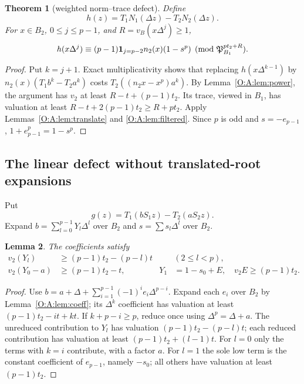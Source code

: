 \documentclass[11pt]{amsart}
\newtheorem{theorem}{Theorem}[section]
\newtheorem{lemma}[theorem]{Lemma}
\theoremstyle{definition}
\theoremstyle{remark}
\begin{document}
\begin{theorem}[weighted norm--trace defect]\label{O:A:thm:h}
Define
\[
 h(z)=T_1N_1(\Delta z)-T_2N_2(\Delta z).
\]
For $x\in B_2$, $0\le j\le p-1$, and $R=v_B(x\Delta^j)\ge1$,
\begin{equation}
 h(x\Delta^j)\equiv(p-1)\mathbf1_{j=p-2}n_2(x)(1-s^p)
       \pmod{\mathfrak P_{B_1}^{pt_2+R}}.\label{O:A:eq:h}
\end{equation}
\end{theorem}
\begin{proof}
Put $k=j+1$.
Exact multiplicativity shows that replacing $h(x\Delta^{k-1})$ by
$n_2(x)(T_1b^k-T_2a^k)$ costs
$T_2((n_2x-x^p)a^k)$.
By Lemma~\ref{O:A:lem:power}, the argument has $v_2$ at least
$R-t+(p-1)t_2$.  Its trace, viewed in $B_1$, has valuation at least
$R-t+2(p-1)t_2\ge R+pt_2$.
Apply Lemmas~\ref{O:A:lem:translate} and \ref{O:A:lem:filtered}.
Since $p$ is odd and $s=-e_{p-1}$, $1+e_{p-1}^p=1-s^p$.
\end{proof}

\subsection{The linear defect without translated-root expansions}
Put
\[
 g(z)=T_1(bS_1z)-T_2(aS_2z).
\]
Expand $b=\sum_{l=0}^{p-1}Y_l\Delta^l$ over $B_2$ and
$s=\sum s_l\Delta^l$ over $B_2$.
\begin{lemma}\label{O:A:lem:bcoeff}
The coefficients satisfy
\begin{align*}
 v_2(Y_l)&\ge(p-1)t_2-(p-l)t&& (2\le l<p),\\
 v_2(Y_0-a)&\ge(p-1)t_2-t,&
 Y_1&=1-s_0+E,\quad v_2E\ge(p-1)t_2.
\end{align*}
\end{lemma}
\begin{proof}
Use $b=a+\Delta+\sum_{i=1}^{p-1}(-1)^ie_i\Delta^{p-i}$.
Expand each $e_i$ over $B_2$ by Lemma~\ref{O:A:lem:coeff}; its $\Delta^k$
coefficient has valuation at least $(p-1)t_2-it+kt$.
If $k+p-i\ge p$, reduce once using $\Delta^p=\Delta+a$.
The unreduced contribution to $Y_l$ has valuation
$(p-1)t_2-(p-l)t$; each reduced contribution has valuation at least
$(p-1)t_2+(l-1)t$.
For $l=0$ only the terms with $k=i$ contribute, with a factor $a$.
For $l=1$ the sole low term is the constant coefficient of $e_{p-1}$,
namely $-s_0$; all others have valuation at least $(p-1)t_2$.
\end{proof}
\end{document}
